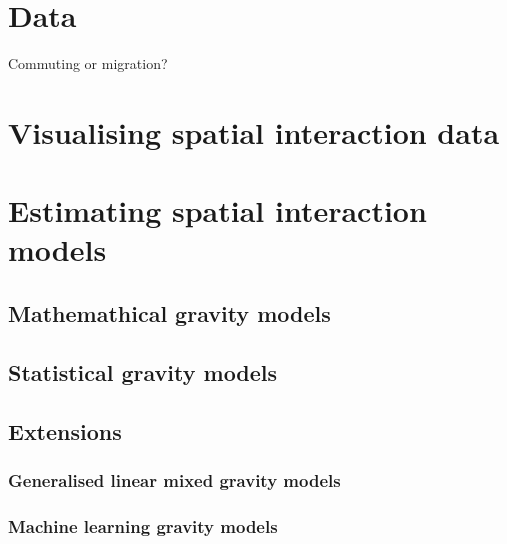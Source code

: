 \documentclass[
  a4paper, 
  twoside,
  final
]{article}
\begin{document}
\section{Data}\label{sec-data}

Commuting or migration?

\section{Visualising spatial interaction data}\label{sec-visualising}

\section{Estimating spatial interaction models}\label{sec-modelling}

\subsection{Mathemathical gravity
models}\label{mathemathical-gravity-models}

\subsection{Statistical gravity
models}\label{statistical-gravity-models}

\subsection{Extensions}\label{extensions}

\subsubsection{Generalised linear mixed gravity
models}\label{generalised-linear-mixed-gravity-models}

\subsubsection{Machine learning gravity
models}\label{machine-learning-gravity-models}


\renewcommand\refname{References}
  
\end{document}
